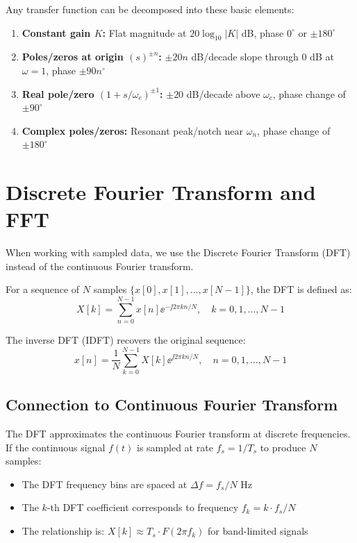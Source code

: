 \begin{keyconceptbox}[title=Standard Bode Plot Building Blocks]
Any transfer function can be decomposed into these basic elements:
\begin{enumerate}
    \item \textbf{Constant gain $K$:} Flat magnitude at $20\log_{10}|K|$ dB, phase $0^{\circ}$ or $\pm 180^{\circ}$
    \item \textbf{Poles/zeros at origin $(s)^{\pm n}$:} $\pm 20n$ dB/decade slope through 0 dB at $\omega = 1$, phase $\pm 90n^{\circ}$
    \item \textbf{Real pole/zero $(1 + s/\omega_c)^{\pm 1}$:} $\pm 20$ dB/decade above $\omega_c$, phase change of $\pm 90^{\circ}$
    \item \textbf{Complex poles/zeros:} Resonant peak/notch near $\omega_n$, phase change of $\pm 180^{\circ}$
\end{enumerate}
\end{keyconceptbox}

\section{Discrete Fourier Transform and FFT}

When working with sampled data, we use the Discrete Fourier Transform (DFT) instead of the continuous Fourier transform.

\begin{definitionbox}[title=Definition 5.2: Discrete Fourier Transform (DFT)]
For a sequence of $N$ samples $\{x[0], x[1], \ldots, x[N-1]\}$, the DFT is defined as:
\begin{equation}
X[k] = \sum_{n=0}^{N-1} x[n] \ee^{-\jj 2\pi kn/N}, \quad k = 0, 1, \ldots, N-1
\end{equation}

The inverse DFT (IDFT) recovers the original sequence:
\begin{equation}
x[n] = \frac{1}{N} \sum_{k=0}^{N-1} X[k] \ee^{\jj 2\pi kn/N}, \quad n = 0, 1, \ldots, N-1
\end{equation}
\end{definitionbox}

\subsection{Connection to Continuous Fourier Transform}

The DFT approximates the continuous Fourier transform at discrete frequencies. If the continuous signal $f(t)$ is sampled at rate $f_s = 1/T_s$ to produce $N$ samples:
\begin{itemize}
    \item The DFT frequency bins are spaced at $\Delta f = f_s/N$ Hz
    \item The $k$-th DFT coefficient corresponds to frequency $f_k = k \cdot f_s/N$
    \item The relationship is: $X[k] \approx T_s \cdot F(2\pi f_k)$ for band-limited signals
\end{itemize}

